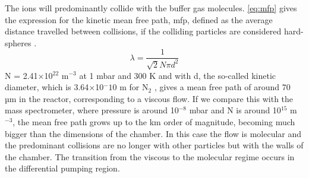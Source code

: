 The ions will predominantly collide with the buffer gas molecules. \autoref{eq:mfp} gives the expression for the kinetic mean free path, \acrshort{mfp}, defined as the average distance travelled between collisions, if the colliding particles are considered hard-spheres \cite{hirschfelder1954molecular}.
%
\begin{equation}
    \lambda = \frac{1}{\sqrt{2}N\pi d^2}
\label{eq:mfp}
\end{equation}
%
N = 2.41$\times$10$^{22}$ m$^{-3}$ at 1 mbar and 300 K and with d, the so-called kinetic diameter, which is 3.64$\times$10$^-{10}$ m for N$_2$ \cite{ismail2015gas}, gives a mean free path of around 70 µm in the reactor, corresponding to a viscous flow.
If we compare this  with the mass spectrometer, where pressure is around 10$^{-8}$ mbar and N is around 10$^{15}$ m$^{-3}$,  the mean free path grows up to the km order of magnitude, becoming much bigger than the dimensions of the chamber. In this case the flow is molecular and the predominant collisions are no longer with other particles but with the walls of the chamber.
%
The transition from the viscous to the molecular regime occurs in the differential pumping region.

































